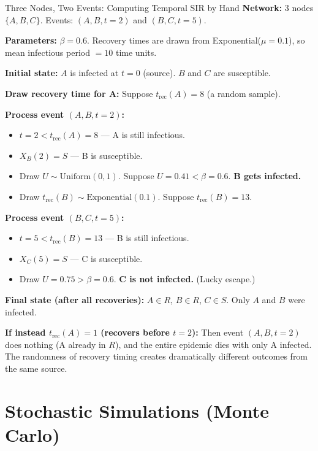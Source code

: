 \begin{examplebox}{Three Nodes, Two Events: Computing Temporal SIR by Hand}
\textbf{Network:} 3 nodes $\{A, B, C\}$. Events: $(A, B, t=2)$ and $(B, C, t=5)$.

\textbf{Parameters:} $\beta = 0.6$. Recovery times are drawn from Exponential($\mu=0.1$), so mean infectious period $= 10$ time units.

\textbf{Initial state:} $A$ is infected at $t=0$ (source). $B$ and $C$ are susceptible.

\textbf{Draw recovery time for A:} Suppose $t_{\text{rec}}(A) = 8$ (a random sample).

\medskip
\textbf{Process event $(A, B, t=2)$:}
\begin{itemize}[noitemsep]
    \item $t = 2 < t_{\text{rec}}(A) = 8$ --- A is still infectious. \checkmark
    \item $X_B(2) = S$ --- B is susceptible. \checkmark
    \item Draw $U \sim \text{Uniform}(0,1)$. Suppose $U = 0.41 < \beta = 0.6$. \textbf{B gets infected.}
    \item Draw $t_{\text{rec}}(B) \sim \text{Exponential}(0.1)$. Suppose $t_{\text{rec}}(B) = 13$.
\end{itemize}

\textbf{Process event $(B, C, t=5)$:}
\begin{itemize}[noitemsep]
    \item $t = 5 < t_{\text{rec}}(B) = 13$ --- B is still infectious. \checkmark
    \item $X_C(5) = S$ --- C is susceptible. \checkmark
    \item Draw $U = 0.75 > \beta = 0.6$. \textbf{C is not infected.} (Lucky escape.)
\end{itemize}

\textbf{Final state (after all recoveries):} $A \in R$, $B \in R$, $C \in S$. Only $A$ and $B$ were infected.

\textbf{If instead $t_{\text{rec}}(A) = 1$ (recovers before $t=2$):} Then event $(A, B, t=2)$ does nothing (A already in $R$), and the entire epidemic dies with only A infected. The randomness of recovery timing creates dramatically different outcomes from the same source.
\end{examplebox}

\section{Stochastic Simulations (Monte Carlo)}
\label{sec:monte_carlo}

